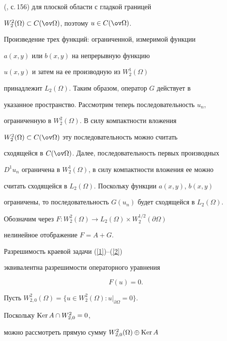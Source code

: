 (\cite{trudinger}, с.\,156) для плоской области с гладкой границей


$W^2_2(\Omega) \subset C(\ov \Omega)$, поэтому $u\in C(\ov \Omega)$.


Произведение трех функций: ограниченной, измеримой функции


$a(x,y)$ или $b(x,y)$ на непрерывную функцию


$u(x,y)$ и затем на ее производную из $W^1_2(\Omega)$


принадлежит $L_2(\Omega)$. Таким образом, оператор $G$ действует в 


указанное пространство. Рассмотрим теперь последовательность $u_n$,


ограниченную в $W^2_2(\Omega)$. В силу компактности вложения


$W^2_2(\Omega) \subset C(\ov \Omega)$ эту последовательность можно считать 


сходящейся в $C(\ov \Omega)$. Далее, последовательность первых производных 


$D^1u_n$ ограничена в $W^1_2(\Omega)$, в силу компактности вложения ее можно 


считать сходящейся в $L_2(\Omega)$. Поскольку функции $a(x,y)$, $b(x,y)$


ограничены, то последовательность $G(u_n)$ будет сходящейся в $L_2(\Omega)$.





Обозначим через $F : W^2_2(\Omega)\longrightarrow L_2(\Omega)


\times W^{1/2}_2(\partial \Omega)$ 


нелинейное отображение $F=A+G$.


Разрешимость краевой задачи (\ref{1})--(\ref{2})


эквивалентна разрешимости операторного уравнения


\begin{equation}


\label{3}


F(u)=0.


\end{equation}





Пусть $W^2_{2,0}(\Omega)=\{ u \in W^2_2(\Omega) :


u|_{\partial \Omega }=0\}$.


Поскольку $\operatorname{Ker} A\cap W^2_{2,0}={0}$,


можно рассмотреть прямую сумму $W^2_{2,0}(\Omega)\oplus \operatorname{Ker} A$


